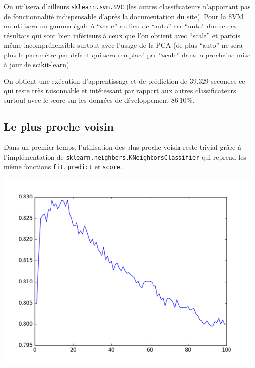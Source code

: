 \documentclass[12pt,a4paper]{article}
\begin{document}
{On utilisera d'ailleurs \lstinline[style=default]|sklearn.svm.SVC| (les autres classificateurs n'apportant pas de fonctionnalité indispensable d'après la documentation du site).
Pour la SVM on utilisera un gamma égale à ``scale'' au lieu de ``auto'' car ``auto'' donne des résultats qui sont bien inférieurs à ceux que l'on obtient avec ``scale'' et parfois même incompréhensible surtout avec l'usage de la PCA (de plus ``auto'' ne sera plus le paramètre par défaut qui sera remplacé par ``scale'' dans la prochaine mise à jour de scikit-learn).

On obtient une exécution d'apprentissage et de prédiction de 39,329 secondes ce qui reste très raisonnable et intéressant par rapport aux autres classificateurs surtout avec le score sur les données de développement 86,10\%.

\newpage

\subsection{Le plus proche voisin}

Dans un premier temps, l'utilisation des plus proche voisin reste trivial grâce à l'implémentation de \lstinline[style=default]|sklearn.neighbors.KNeighborsClassifier| qui reprend les même fonctions \lstinline[style=default]|fit|, \lstinline[style=default]|predict| et  \lstinline[style=default]|score|.

\begin{center}
	\includegraphics[scale=0.75]{KNeighbors.png}
\end{center}


}
\end{document}
